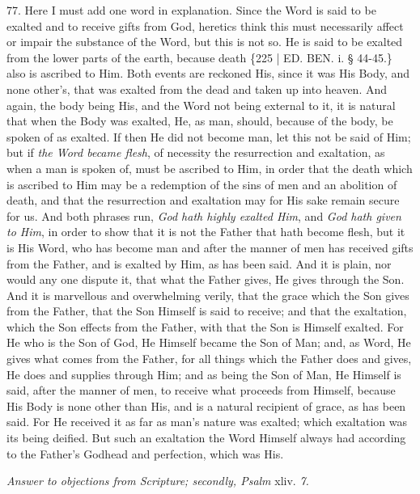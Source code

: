 77. Here I must add one word
in explanation. Since the Word is said to be exalted and to receive
gifts from God, heretics think this must necessarily affect or impair
the substance of the Word, but this is not so. He is said to be
exalted from the lower parts of the earth, because death \{225 | ED. BEN.
i. § 44-45.\} also is ascribed to Him. Both events are reckoned His,
since it was His Body, and none other's, that was exalted from the
dead and taken up into heaven. And again, the body being His, and the
Word not being external to it, it is natural that when the Body was
exalted, He, as man, should, because of the body, be spoken of as
exalted. If then He did not become man, let this not be said of Him;
but if \emph{the Word became flesh}, of necessity the resurrection and
exaltation, as when a man is spoken of, must be ascribed to Him, in order
that the death which is ascribed to Him may be a redemption of the
sins of men and an abolition of death, and that the resurrection and
exaltation may for His sake remain secure for us. And both phrases
run, \emph{God hath highly exalted Him}, and \emph{God hath given to Him},
in order to show that it is not the Father that hath become flesh, but
it is His Word, who has become man and after the manner of men has
received gifts from the Father, and is exalted by Him, as has been
said. And it is plain, nor would any one dispute it, that what the
Father gives, He gives through the Son. And it is marvellous and
overwhelming verily, that the grace which the Son gives from the
Father, that the Son Himself is said to receive; and that the
exaltation, which the Son effects from the Father, with that the Son
is Himself exalted. For He who is the Son of God, He Himself became
the Son of Man; and, as Word, He gives what comes from the Father, for
all things which the Father does and gives, He does and supplies
through Him; and as being the Son of Man, He Himself is said, after
the manner of men, to receive what proceeds from Himself, because His
Body is none other than His, and is a natural recipient of grace, as
has been said. For He received it as far as man's nature was exalted;
which exaltation was its being deified. But such an exaltation the
Word Himself always had according to the Father's Godhead and
perfection, which was His.


\emph{Answer
to objections from Scripture; secondly, Psalm}
xliv. \emph{7.}

